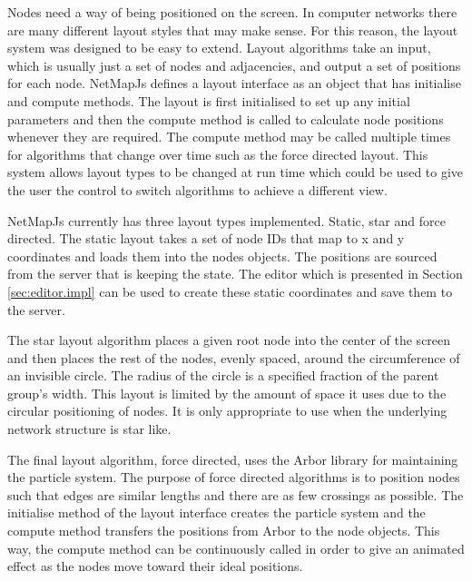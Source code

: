 \documentclass[11pt, a4paper]{article}
\begin{document}
Nodes need a way of being positioned on the screen. In computer networks there
are many different layout styles that may make sense. For this reason, the
layout system was designed to be easy to extend. Layout algorithms take an
input, which is usually just a set of nodes and adjacencies, and output a set of
positions for each node. NetMapJs defines a layout interface as an object that
has initialise and compute methods. The layout is first initialised to set up
any initial parameters and then the compute method is called to calculate node
positions whenever they are required. The compute method may be called multiple
times for algorithms that change over time such as the force directed layout.
This system allows layout types to be changed at run time which could be used to
give the user the control to switch algorithms to achieve a different view.

NetMapJs currently has three layout types implemented. Static, star and force
directed. The static layout takes a set of node IDs that map to x and y
coordinates and loads them into the nodes objects. The positions are sourced
from the server that is keeping the state. The editor which is presented in
Section \ref{sec:editor.impl} can be used to create these static coordinates and
save them to the server.

The star layout algorithm places a given root node into the center of the screen
and then places the rest of the nodes, evenly spaced, around the circumference
of an invisible circle. The radius of the circle is a specified fraction of the
parent group's width. This layout is limited by the amount of space it uses due
to the circular positioning of nodes. It is only appropriate to use when the
underlying network structure is star like.

The final layout algorithm, force directed, uses the Arbor library for
maintaining the particle system. The purpose of force directed algorithms is to
position nodes such that edges are similar lengths and there are as few
crossings as possible.  The initialise method of the layout interface creates
the particle system and the compute method transfers the positions from Arbor to
the node objects. This way, the compute method can be continuously called in
order to give an animated effect as the nodes move toward their ideal positions.
\end{document}
